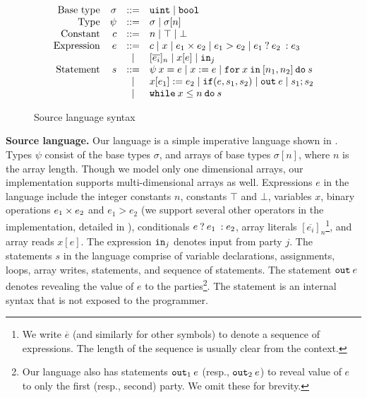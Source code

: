
\begin{figure}[htp]
  \footnotesize
  \[
  \begin{array}{rrcl}
    \ftext{Base type} & \sigma &::=& \kw{uint} \mid \kw{bool}\\
    \ftext{Type} & \psi &::=& \sigma \mid \sigma[n]\\
    \ftext{Constant} & c &::=& n \mid \top \mid \bot\\
    \ftext{Expression} & e &::=& c \mid x \mid e_{1} \mulop e_{2} \mid e_{1} > e_{2} \mid \cond{e_{1}}{e_{2}}{e_{3}}\\
    & &\mid& [\overline{e_{i}}]_{n} \mid x[e] \mid \kw{in}_{j}\\
    \ftext{Statement} & s &::=& \psi\:x = e \mid x := e \mid \forl{x}{n_{1}}{n_{2}}{s}\\
    & & \mid& x[e_{1}] := e_{2} \mid \ite{e}{s_{1}}{s_{2}} \mid \kw{out}\:e \mid s_{1}; s_{2}\\
    & & \mid& \loops{x}{n}{s}
  \end{array}
  \]
\caption{Source language syntax}
\label{fig:srclang}
\end{figure}

\noindent\textbf{Source language.} Our language
 is a simple imperative language shown in . Types
$\psi$ consist of the base types $\sigma$, and arrays
of base types $\sigma[n]$, where $n$ is the array length. Though we
model only one dimensional arrays, our implementation supports
 multi-dimensional arrays as well. Expressions $e$ in the language include the
 integer constants $n$,  constants $\top$ and $\bot$,
variables $x$, binary operations $e_{1} \times e_{2}$ and $e_{1} >
e_{2}$ (we support several other
operators in the implementation, detailed in ),
conditionals ${{e}\:?\:{e_{1}}\::{e_{2}}}$,
array literals
$[\overline{e_{i}}]_{n}$\footnote{We write $\overline{e}$ (and
  similarly for other symbols) to denote a sequence of expressions.
The length of the sequence is usually clear from the context.}, and
array reads $x[e]$. The expression ${\mathtt{in}}_{j}$ denotes input from
party $j$. The statements $s$ in the language comprise of variable
declarations, assignments,
 loops, array writes, 
statements, and sequence of statements. The statement
${\mathtt{out}}\:e$ denotes revealing the value of $e$ to the
parties\footnote{Our language also has statements ${\mathtt{out}}_1\:e$ (resp., ${\mathtt{out}}_2\:e$) to reveal value of $e$ to only the first (resp., second) party. We omit these for brevity.}. The  statement is an internal syntax that is not
exposed to the programmer. \\

